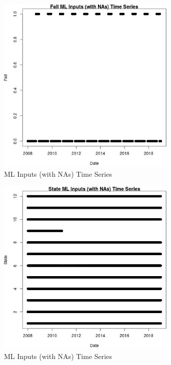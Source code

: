\begin{figure} 
\centering  
\includegraphics[width=0.77\textwidth]{Code_Outputs/Report_ML_input_PM25_Step4_part_f_de_duplicated_aves_prioritize_24hr_obswNAs_FallvDate.jpg} 
\caption{\label{fig:Report_ML_input_PM25_Step4_part_f_de_duplicated_aves_prioritize_24hr_obswNAsFallvDate}ML Inputs (with NAs) Time Series} 
\end{figure} 
 

\begin{figure} 
\centering  
\includegraphics[width=0.77\textwidth]{Code_Outputs/Report_ML_input_PM25_Step4_part_f_de_duplicated_aves_prioritize_24hr_obswNAs_StatevDate.jpg} 
\caption{\label{fig:Report_ML_input_PM25_Step4_part_f_de_duplicated_aves_prioritize_24hr_obswNAsStatevDate}ML Inputs (with NAs) Time Series} 
\end{figure} 
 

